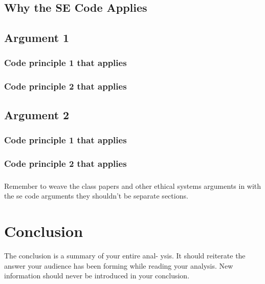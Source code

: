 \documentclass[11pt]{article}
\begin{document}
\begin{multicols}{2}
\subsection{Why the SE Code Applies}
\subsection{Argument 1}
\subsubsection{Code principle 1 that applies}
\subsubsection{Code principle 2 that applies}
\subsection{Argument 2}
\subsubsection{Code principle 1 that applies}
\subsubsection{Code principle 2 that applies}

\subsubsection*{}
Remember to weave the class papers and other ethical systems arguments in with the se code arguments they shouldn't be separate sections.  

\section{Conclusion}
The conclusion is a summary of your entire anal- ysis. It should reiterate the answer your audience has been forming while reading your analysis. New information should never be introduced in your conclusion. \cite{texTemp}

\end{multicols}
\newpage

\nocite{*}




\end{document}
